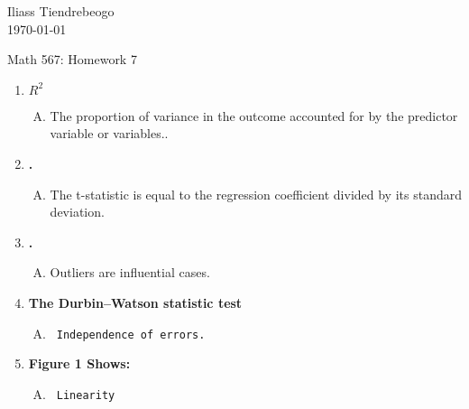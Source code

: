 \documentclass{article}[20pt]
\begin{document}
\hfill Iliass Tiendrebeogo\\

\hfill \today\\

\bigskip

\begin{center}
  \begin{Large}
    Math 567: Homework 7 \\
    
   
  \end{Large}
\end{center} 


\begin{enumerate}[1.]
\item  %
{\bf$ R^2 $}
 \begin{enumerate}[D.]
 \item 
The proportion of variance in the outcome accounted for by the predictor variable or variables..
\end{enumerate}
\item %
{\bf .}
 \begin{enumerate}[D.]
 \item 
  The t-statistic is equal to the regression coefficient divided by its standard deviation.
  \end{enumerate}

\item %
{\bf .}
 \begin{enumerate}[D.]
 \item 
  Outliers are influential cases.
  \end{enumerate}

\item %
 {\bf The Durbin–Watson statistic test}
 \begin{enumerate}[B.]
 \item 
  \texttt{ Independence of errors.}
  
 \end{enumerate}
 
 \item %
{\bf Figure 1 Shows:}
 \begin{enumerate}[C.]
 \item 
  \texttt{ Linearity }
  
 \end{enumerate}

\end{enumerate}
\end{document}
